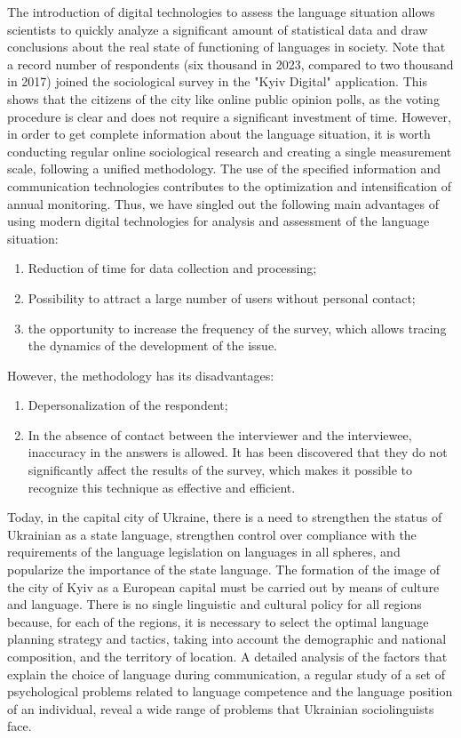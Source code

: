 \documentclass[english]{textolivre}
\begin{document}
The introduction of digital technologies to assess the language situation allows scientists to quickly analyze a significant amount of statistical data and draw conclusions about the real state of functioning of languages in society. Note that a record number of respondents (six thousand in 2023, compared to two thousand in 2017) joined the sociological survey in the "Kyiv Digital" application. This shows that the citizens of the city like online public opinion polls, as the voting procedure is clear and does not require a significant investment of time. However, in order to get complete information about the language situation, it is worth conducting regular online sociological research and creating a single measurement scale, following a unified methodology. The use of the specified information and communication technologies contributes to the optimization and intensification of annual monitoring. Thus, we have singled out the following main advantages of using modern digital technologies for analysis and assessment of the language situation: 
\begin{enumerate}
 \item Reduction of time for data collection and processing;
 \item Possibility to attract a large number of users without personal contact;
 \item the opportunity to increase the frequency of the survey, which allows tracing the dynamics of the development of the issue.
\end{enumerate}

However, the methodology has its disadvantages: \begin{enumerate} \item Depersonalization of the respondent; \item In the absence of contact between the interviewer and the interviewee, inaccuracy in the answers is allowed. It has been discovered that they do not significantly affect the results of the survey, which makes it possible to recognize this technique as effective and efficient.
\end{enumerate}

Today, in the capital city of Ukraine, there is a need to strengthen the status of Ukrainian as a state language, strengthen control over compliance with the requirements of the language legislation on languages in all spheres, and popularize the importance of the state language. The formation of the image of the city of Kyiv as a European capital must be carried out by means of culture and language. There is no single linguistic and cultural policy for all regions because, for each of the regions, it is necessary to select the optimal language planning strategy and tactics, taking into account the demographic and national composition, and the territory of location. A detailed analysis of the factors that explain the choice of language during communication, a regular study of a set of psychological problems related to language competence and the language position of an individual, reveal a wide range of problems that Ukrainian sociolinguists face.
\end{document}
